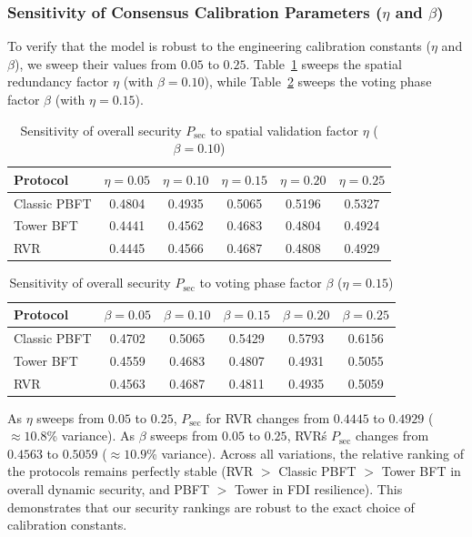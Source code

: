 \documentclass[10pt,twocolumn,journal]{IEEEtran}
\begin{document}
\subsubsection{Sensitivity of Consensus Calibration Parameters (\texorpdfstring{$\eta$}{eta} and \texorpdfstring{$\beta$}{beta})}
To verify that the model is robust to the engineering calibration constants ($\eta$ and $\beta$), we sweep their values from $0.05$ to $0.25$. Table~\ref{tab:sensitivity_eta} sweeps the spatial redundancy factor $\eta$ (with $\beta=0.10$), while Table~\ref{tab:sensitivity_beta} sweeps the voting phase factor $\beta$ (with $\eta=0.15$).

\begin{table}[t]
\caption{Sensitivity of overall security $P_{\mathrm{sec}}$ to spatial validation factor $\eta$ ($\beta=0.10$)}
\label{tab:sensitivity_eta}
\centering
\scriptsize
\begin{tabular}{@{}lccccc@{}}
\toprule
\textbf{Protocol} & \textbf{$\eta=0.05$} & \textbf{$\eta=0.10$} & \textbf{$\eta=0.15$} & \textbf{$\eta=0.20$} & \textbf{$\eta=0.25$} \\
\midrule
Classic PBFT & 0.4804 & 0.4935 & 0.5065 & 0.5196 & 0.5327 \\
Tower BFT & 0.4441 & 0.4562 & 0.4683 & 0.4804 & 0.4924 \\
RVR & 0.4445 & 0.4566 & 0.4687 & 0.4808 & 0.4929 \\
\bottomrule
\end{tabular}
\end{table}

\begin{table}[t]
\caption{Sensitivity of overall security $P_{\mathrm{sec}}$ to voting phase factor $\beta$ ($\eta=0.15$)}
\label{tab:sensitivity_beta}
\centering
\scriptsize
\begin{tabular}{@{}lccccc@{}}
\toprule
\textbf{Protocol} & \textbf{$\beta=0.05$} & \textbf{$\beta=0.10$} & \textbf{$\beta=0.15$} & \textbf{$\beta=0.20$} & \textbf{$\beta=0.25$} \\
\midrule
Classic PBFT & 0.4702 & 0.5065 & 0.5429 & 0.5793 & 0.6156 \\
Tower BFT & 0.4559 & 0.4683 & 0.4807 & 0.4931 & 0.5055 \\
RVR & 0.4563 & 0.4687 & 0.4811 & 0.4935 & 0.5059 \\
\bottomrule
\end{tabular}
\end{table}

As $\eta$ sweeps from $0.05$ to $0.25$, $P_{\mathrm{sec}}$ for RVR changes from $0.4445$ to $0.4929$ ($\approx 10.8$\% variance). As $\beta$ sweeps from $0.05$ to $0.25$, RVR\'s $P_{\mathrm{sec}}$ changes from $0.4563$ to $0.5059$ ($\approx 10.9$\% variance). Across all variations, the relative ranking of the protocols remains perfectly stable (RVR $>$ Classic PBFT $>$ Tower BFT in overall dynamic security, and PBFT $>$ Tower in FDI resilience). This demonstrates that our security rankings are robust to the exact choice of calibration constants.
\end{document}
